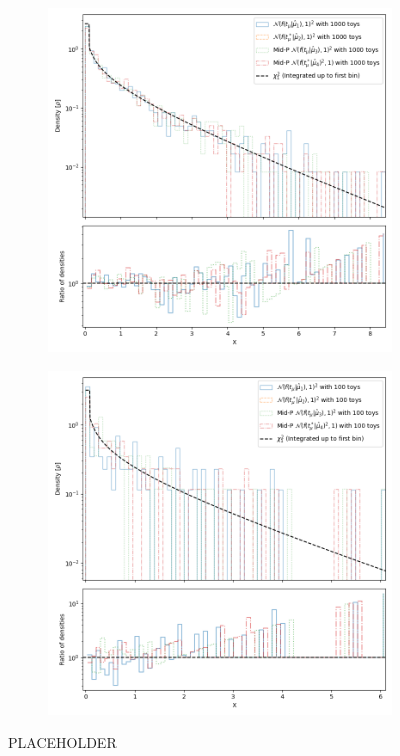 \documentclass[14pt, a4paper]{article}  %
\begin{document}
\begin{figure}[!ht]
	\centering
	\begin{subfigure}[b]{0.49\textwidth}
        \centering
        \includegraphics[width=1\textwidth]{CLT/chi2_book_with_1000_toys.png}
     \end{subfigure}
     \hfill
     \begin{subfigure}[b]{0.49\textwidth}
        \centering
        \includegraphics[width=1\textwidth]{CLT/chi2_book_with_100_toys.png}
     \end{subfigure}
	\caption{PLACEHOLDER}\label{fig:CLT}
 \end{figure}
\end{document}
